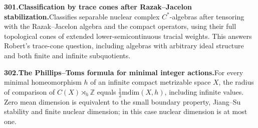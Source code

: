 \documentclass[11pt,a4paper]{article}
\begin{document}
  \par \begin{minipage}{\linewidth}
  \fontsize{10.5}{12.6}\selectfont\RaggedRight
  \hypertarget{result 301}{}
  {\bfseries\textcolor{muted}{301.}\enspace Classification by trace cones after Razak--Jacelon stabilization.}\enspace Classifies separable nuclear complex $C^*$-algebras after tensoring with the Razak--Jacelon algebra and the compact operators, using their full topological cones of extended lower-semicontinuous tracial weights. This answers Robert’s trace-cone question, including algebras with arbitrary ideal structure and both finite and infinite subquotients.\par
  \end{minipage}\par\vspace{5pt}



  \par \begin{minipage}{\linewidth}
  \fontsize{10.5}{12.6}\selectfont\RaggedRight
  \hypertarget{result 302}{}
  {\bfseries\textcolor{muted}{302.}\enspace The Phillips--Toms formula for minimal integer actions.}\enspace For every minimal homeomorphism $h$ of an infinite compact metrizable space $X$, the radius of comparison of $C(X)\rtimes_h\mathbb Z$ equals $\tfrac12\mathrm{mdim}(X,h)$, including infinite values. Zero mean dimension is equivalent to the small boundary property, Jiang--Su stability and finite nuclear dimension; in this case nuclear dimension is at most one.\par
  \end{minipage}\par\vspace{5pt}
\end{document}
